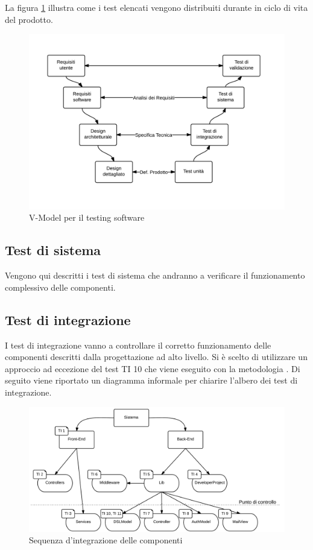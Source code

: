 	La figura \ref{fig:V-Model} illustra come i test elencati vengono distribuiti durante in ciclo di vita del prodotto.

	\begin{figure}[H]
	\centering \includegraphics[width=1\textwidth]{V-Model.png}
	\caption{V-Model per il testing software}
	\label{fig:V-Model}
	\end{figure}

	\subsection{Test di sistema}
	Vengono qui descritti i test di sistema che andranno a verificare il funzionamento complessivo delle componenti.
	
	
	\subsection{Test di integrazione}
	I test di integrazione vanno a controllare il corretto funzionamento delle componenti descritti dalla progettazione ad alto livello. Si è scelto di utilizzare un approccio  ad eccezione del test TI 10 che viene eseguito con la metodologia . Di seguito viene riportato un diagramma informale per chiarire l'albero dei test di integrazione.

	\begin{figure}[H]
	\centering \includegraphics[width=1\textwidth]{sequenza-di-integrazione.png}
	\caption{Sequenza d'integrazione delle componenti}
	\label{fig:sequenza-di-integrazione}
	\end{figure}


